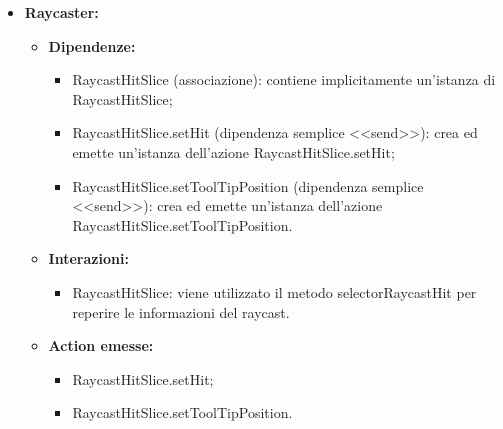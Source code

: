 \begin{itemize}
    \item \textbf{Raycaster:}
          \begin{itemize}
              \item \textbf{Dipendenze:}
                    \begin{itemize}
                        \item RaycastHitSlice (associazione): contiene implicitamente un'istanza di
                              RaycastHitSlice;
                        \item RaycastHitSlice.setHit (dipendenza semplice <<send>>): crea ed emette
                              un'istanza dell'azione RaycastHitSlice.setHit;
                        \item RaycastHitSlice.setToolTipPosition (dipendenza semplice <<send>>): crea ed
                              emette un'istanza dell'azione RaycastHitSlice.setToolTipPosition.
                    \end{itemize}
              \item \textbf{Interazioni:}
                    \begin{itemize}
                        \item RaycastHitSlice: viene utilizzato il metodo selectorRaycastHit per reperire le
                              informazioni del raycast.
                    \end{itemize}
              \item \textbf{Action emesse:}
                    \begin{itemize}
                        \item RaycastHitSlice.setHit;
                        \item RaycastHitSlice.setToolTipPosition.
                    \end{itemize}
          \end{itemize}
\end{itemize}

